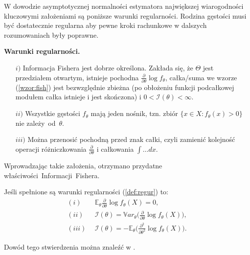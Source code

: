 W dowodzie asymptotycznej normalności estymatora największej wiarogodności kluczowymi założeniami są poniższe warunki regularności. Rodzina gęstości musi być dostatecznie regularna aby pewne kroki rachunkowe w dalszych rozumowaniach były
poprawne.

\begin{definition}\label{def:regur}
\textbf{Warunki regularności.}
\end{definition}
\begin{itemize}
\item[$i)$] Informacja Fishera jest dobrze określona. Zakłada się, że $\Theta$ jest przedziałem
otwartym, istnieje pochodna $\frac{\partial}{\partial\theta}\log f_{\theta}$, całka/suma we wzorze
(\ref{wzor:fish}) jest bezwzględnie zbieżna (po obłożeniu funkcji podcałkowej modułem całka istnieje i jest skończona) i $0 < \mathcal{I}(\theta) < \infty$.
\item[$ii)$] Wszystkie gęstości $f_\theta$ mają jeden nośnik, tzn. zbiór $\{x \in X : f_\theta(x) > 0\}$ nie zależy~od~$\theta$.
\item[$iii)$] Można przenosić pochodną przed znak całki, czyli zamienić kolejność
operacji różniczkowania $\frac{\partial}{\partial\theta}$ i całkowania $\int \dots dx$.
\end{itemize}

Wprowadzając takie założenia, otrzymano przydatne właściwości~Informacji~Fishera.

\begin{proposition}\label{prop:warunki}
Jeśli spełnione są warunki regularności (\ref{def:regur}) to:
\begin{align*}
(i) \ & \ \mathbb{E}_\theta\frac{\partial}{\partial\theta}\log f_{\theta}(X) = 0, \\
(ii) \ & \ \mathcal{I}(\theta) = \mathbb{V}ar_{\theta}\Big(\frac{\partial}{\partial\theta}\log f_{\theta}(X) \Big), \\
(iii) \ & \ \mathcal{I}(\theta) = -\mathbb{E}_{\theta}\Big(\frac{\partial^2}{\partial\theta^2}\log f_\theta(X) \Big).
\end{align*}
\end{proposition}

Dowód tego stwierdzenia można znaleźć w \cite{niemiro}.


